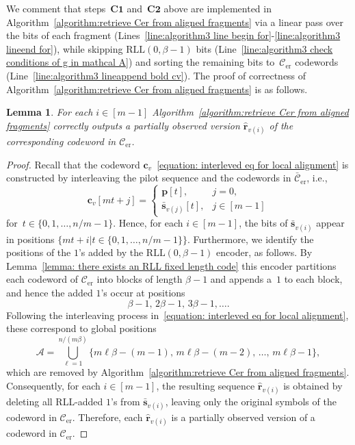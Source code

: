 \documentclass[journal,letterpaper,onecolumn,11pt]{IEEEtran}
\newcommand{\cA}{\mathcal{A}}
\newcommand{\cC}{\mathcal{C}}
\newcommand{\boldc}{\mathbf{c}}
\newcommand{\boldf}{\mathbf{f}}
\newcommand{\boldp}{\mathbf{p}}
\newcommand{\boldr}{\mathbf{r}}
\newcommand{\bolds}{\mathbf{s}}
\newcommand{\boldy}{\mathbf{y}}
\newtheorem{lemma}{Lemma}
\begin{document}
We comment that steps~$\textbf{C1}$ and~$\textbf{C2}$ above are implemented in Algorithm~\ref{algorithm:retrieve Cer from aligned fragments} via a linear pass over the bits of each fragment (Lines~\ref{line:algorithm3 line begin for}-\ref{line:algorithm3 lineend for}), while skipping $\textrm{RLL}(0,\beta-1)$ bits (Line~\ref{line:algorithm3 check conditions of g in mathcal A}) and sorting the remaining bits to~$\cC_\text{er}$ codewords (Line~\ref{line:algorithm3 lineappend bold cv}).
The proof of correctness of Algorithm~\ref{algorithm:retrieve Cer from aligned fragments} is as follows.

\begin{lemma}\label{lemma: rll decode}
For each $i\in[m-1]$ Algorithm~\ref{algorithm:retrieve Cer from aligned fragments} correctly outputs a partially observed version $\hat{\boldr}_{v(i)}$ of the corresponding codeword in $\cC_{\mathrm{er}}$.
\end{lemma}
\begin{proof}

Recall that the codeword $\boldc_v$~\eqref{equation: interleved eq for local alignment} is constructed by interleaving the pilot sequence and the codewords in $\bar{\cC}_{\mathrm{er}}$, i.e.,
\[
\boldc_v[mt+j] =
\begin{cases}
\boldp[t], & j=0,\\
\bar{\bolds}_{v(j)}[t], & j\in[m-1] 
\end{cases}
\]
for~$t\in\{0,1,\ldots,n/m-1\}$.
Hence, for each $i\in[m-1]$, the bits of $\bar{\bolds}_{v(i)}$ appear in positions $\{mt+i|t\in\{0,1,\ldots,n/m-1\}\}$.
Furthermore, we identify the positions of the $1$'s added by the $\mathrm{RLL}(0,\beta-1)$ encoder, as follows. 
By Lemma~\ref{lemma: there exists an RLL fixed length code} this encoder partitions each codeword of $\cC_{\mathrm{er}}$ into blocks of length $\beta-1$ and appends a~$1$ to each block, and hence 
the added $1$'s occur at positions
\[
\beta-1,\,2\beta-1,\,3\beta-1,\dots.
\]
Following the interleaving process in~\eqref{equation: interleved eq for local alignment}, these correspond to global positions
\[
\cA=\bigcup_{\ell=1}^{n/(m\beta)}\{m\ell\beta-(m-1),\,m\ell\beta-(m-2),\,\dots,\,m\ell\beta-1\},
\]
which are removed by Algorithm~\ref{algorithm:retrieve Cer from aligned fragments}. 
Consequently, for each $i\in[m-1]$, the resulting sequence $\hat{\boldr}_{v(i)}$ is obtained by deleting all RLL-added $1$'s from $\bar{\bolds}_{v(i)}$, leaving only the original symbols of the codeword in $\cC_{\mathrm{er}}$. 
Therefore, each $\hat{\boldr}_{v(i)}$ is a partially observed version of a codeword in $\cC_{\mathrm{er}}$.
\end{proof}
\end{document}
